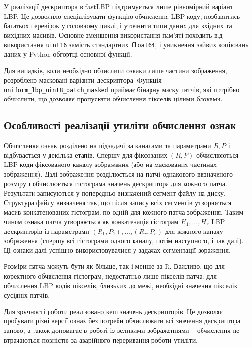 У реалізації дескриптора в fastLBP підтримується лише рівномірний варіант LBP.
Це дозволило спеціалізувати функцію обчислення LBP коду, позбавитись багатьох перевірок у головному циклі, і уточнити типи даних для вхідних та вихідних масивів.
Основне зменшення використання пам'яті походить від використання \verb|uint16| замість стандартних \verb|float64|, 
і уникнення зайвих копіювань даних у Python-обгортці основної функції.

Для випадків, коли необхідно обчислити ознаки лише частини зображення, розроблено масковані варіанти дескриптора. 
Функція \verb|uniform_lbp_uint8_patch_masked| приймає бінарну маску патчів, які потрібно обчислити, що дозволяє пропускати обчислення пікселів цілими блоками. 

\subsection{Особливості реалізації утиліти обчислення ознак}\label{section2.2c}\hfill

Обчислення ознак розділено на підзадачі за каналами та параметрами $R,P$ і відбувається у декілька етапів.
Спершу для фіксованих $(R,P)$ обчислюються LBP коди фіксованого каналу зображення (або на маскованих частинах зображення).
Далі зображення розділюється на патчі однакового визначеного розміру і обчислюється гістограма значень дескриптора для кожного патча.
Результати записуються у попередньо визначений сегмент файлу на диску.
Структура файлу визначена так, що після запису всіх сегментів утворюється масив конкатенованих гістограм, по одній для кожного патча зображення.
Таким чином ознака патча утворюється як конкатенація гістограм $H_1,\dots ,H_r$ LBP дескрипторів із параметрами $(R_1,P_1),\dots ,(R_r,P_r)$ для кожного каналу зображення 
(спершу всі гістограми одного каналу, потім наступного, і так далі).
Ці ознаки далі успішно використовувалися у задачах сегментації зораження.

Розміри патча можуть бути як більше, так і менше за R.
Важливо, що для коректного обчислення гістограм, недостатньо лише пікселів патча: 
для обчислення LBP кодів пікселів, близьких до межі, необхідні значення пікселів сусідніх патчів.

Для зручності роботи реалізовано кеш значень дескрипторів. 
Це дозволяє пробувати різні версії ознак без потреби обчислювати всі значення дескриптора заново, 
а також допомагає в роботі із великими зображеннями -- обчислення не втрачаються повністю за аварійного переривання роботи утиліти.

